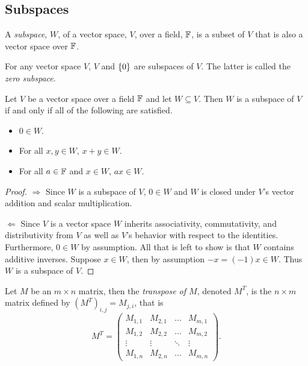 \pagebreak

\subsection{Subspaces}

\begin{definition}[Subspace]
	A \textit{subspace}, $W$, of a vector space, $V$, over a field, $\mathbb{F}$, is a subset of $V$ that is also a vector space over $\mathbb{F}$.
\end{definition}
\begin{example}
	For any vector space $V$, $V$ and $\lbrace 0 \rbrace$ are subspaces of $V$.
	The latter is called the \textit{zero subspace}.
\end{example}

\begin{thm}
	Let $V$ be a vector space over a field $\mathbb{F}$ and let $W\subseteq V$.
	Then $W$ is a subspace of $V$ if and only if all of the following are satisfied.
	\begin{itemize}
		\item $0\in W$.
		\item For all $x,y\in W$, $x+y\in W$.
		\item For all $a\in\mathbb{F}$ and $x\in W$, $ax\in W$.
	\end{itemize}
\end{thm}
\begin{proof}
	$\Rightarrow$ Since $W$ is a subspace of $V$, $0\in W$ and $W$ is closed under $V$'s vector addition and scalar multiplication.

	$\Leftarrow$ Since $V$ is a vector space $W$ inherits associativity, commutativity, and distributivity from $V$ as well as $V$'s behavior with respect to the identities.
	Furthermore, $0\in W$ by assumption.
	All that is left to show is that $W$ contains additive inverses.
	Suppose $x\in W$, then by assumption $-x=(-1)x\in W$.
	Thus $W$ is a subspace of $V$.
\end{proof}

\begin{definition}
	Let $M$ be an $m\times n$ matrix, then the \textit{transpose of $M$}, denoted $M^T$, is the $n\times m$ matrix defined by $(M^T)_{i,j}=M_{j,i}$, that is
	\[
		M^T=
		\begin{pmatrix}
			M_{1,1} & M_{2,1} & \ldots & M_{m,1}\\
			M_{1,2} & M_{2,2} & \ldots & M_{m,2}\\
			\vdots & \vdots & \ddots & \vdots\\
			M_{1,n} & M_{2,n} & \ldots & M_{m,n}
		\end{pmatrix}.
	\]
\end{definition}

